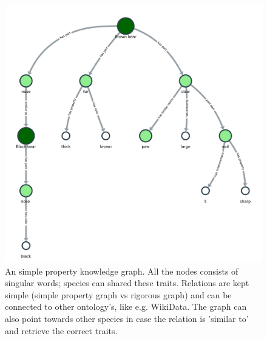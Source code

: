 \documentclass[a4paper, 12pt, oneside]{book} %
\begin{document}
\begin{figure}[htpb]
 \centering
 \includegraphics[width=\textwidth]{figures/kngraph_rec.pdf}
 \caption[Knowledge Graph Future Example]{An simple property knowledge graph. All the nodes consists of singular words; species can shared these traits. Relations are kept simple (simple property graph vs rigorous graph) and can be connected to other ontology's, like e.g. WikiData. The graph can also point towards other species in case the relation is 'similar to' and retrieve the correct traits.}
 \label{fig:kngraph_rec}
\end{figure}


\printbibliography
\newpage
\end{document}
